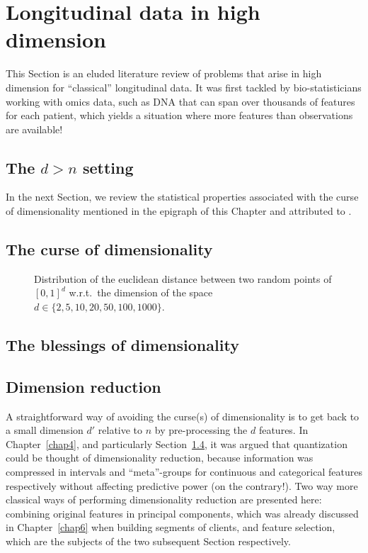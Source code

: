 \section{Longitudinal data in high dimension}

This Section is an eluded literature review of problems that arise in high dimension for ``classical'' longitudinal data. It was first tackled by bio-statisticians working with omics data, such as DNA that can span over thousands of features for each patient, which yields a situation where more features than observations are available!

\subsection{The $d > n$ setting}

In the next Section, we review the statistical properties associated with the curse of dimensionality mentioned in the epigraph of this Chapter and attributed to .

\subsection{The curse of dimensionality}

\begin{figure}[!ht]
\centering
\resizebox{\textwidth}{!}{}
\caption{Distribution of the euclidean distance between two random points of $[0,1]^d$ w.r.t.\ the dimension of the space $d \in \{ 2, 5, 10, 20, 50, 100, 1000 \}$.}
\label{fig:distance}
\end{figure}

\subsection{The blessings of dimensionality}


\subsection{Dimension reduction}

A straightforward way of avoiding the curse(s) of dimensionality is to get back to a small dimension $d'$ relative to $n$ by pre-processing the $d$ features. In Chapter~\ref{chap4}, and particularly Section~\ref{}, it was argued that quantization could be thought of dimensionality reduction, because information was compressed in intervals and ``meta''-groups for continuous and categorical features respectively without affecting predictive power (on the contrary!). Two way more classical ways of performing dimensionality reduction are presented here: combining original features in principal components, which was already discussed in Chapter~\ref{chap6} when building segments of clients, and feature selection, which are the subjects of the two subsequent Section respectively.

